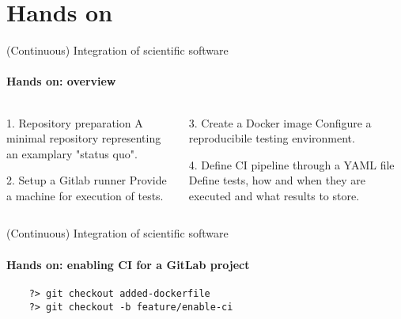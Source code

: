 \section{Hands on}

\begin{frame}{(Continuous) Integration of scientific software}
    \framesubtitle{Hands on: overview}
    \begin{columns}
    \begin{column}{0.48\textwidth}
        \begin{block}{1. Repository preparation}
            A minimal repository representing an examplary
            "status quo".
        \end{block}
        \begin{block}{2. Setup a Gitlab runner}
            Provide a machine for execution of tests.
        \end{block}
    \end{column}

    \begin{column}{0.48\textwidth}
        \begin{block}{3. Create a Docker image}
            Configure a reproducibile testing environment.
        \end{block}
        \begin{exampleblock}{4. Define CI pipeline through a YAML file}
            Define tests, how and when they are executed and what
            results to store.
        \end{exampleblock}
    \end{column}
    \end{columns}
\end{frame}

\begin{frame}[fragile]{(Continuous) Integration of scientific software} 
    \framesubtitle{Hands on: enabling CI for a GitLab project } 

    \vfill

    \begin{verbatim}
    ?> git checkout added-dockerfile 
    ?> git checkout -b feature/enable-ci
    \end{verbatim}

\end{frame}

